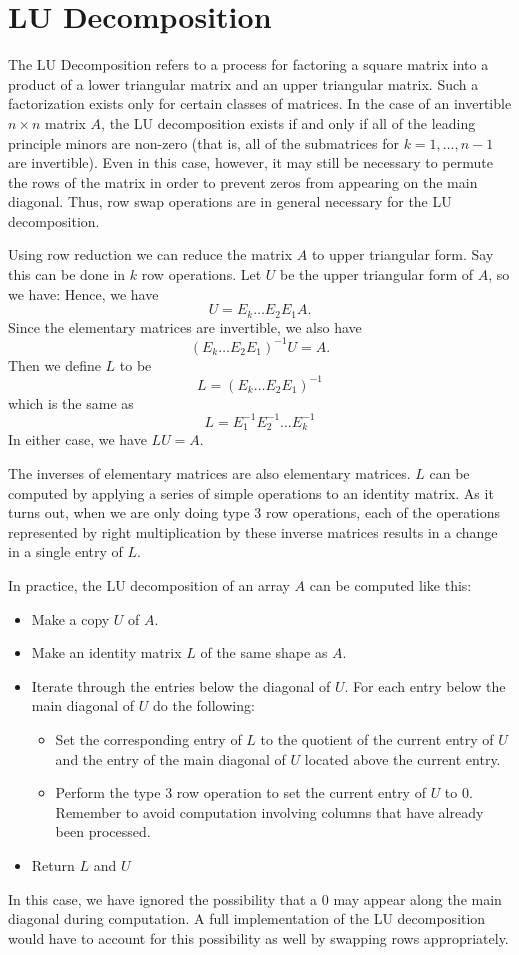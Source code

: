\section*{LU Decomposition}
The LU Decomposition refers to a process for factoring a square matrix into 
a product of a lower triangular matrix and an upper triangular matrix. Such 
a factorization exists only for certain classes of matrices. In the case 
of an invertible $n \times n$ matrix $A$, the LU decomposition exists if and only if all
of the leading principle minors are non-zero (that is, all of the
submatrices  for $k = 1,\ldots,n-1$ are invertible). Even in 
this case, however, it may still be necessary to permute the rows of the 
matrix in order to prevent zeros from appearing on the main diagonal. Thus, 
row swap operations are in general necessary for the LU decomposition. 

Using row reduction we can reduce the matrix $A$ to upper triangular form.
Say this can be done in $k$ row operations.
Let $U$ be the upper triangular form of $A$, so we have:
Hence, we have
\[
U = E_k \dots E_2 E_1 A.
\]
Since the elementary matrices are invertible, we also have
\[
(E_k \dots E_2 E_1)^{-1} U =  A.
\]
Then we define $L$ to be
\[
L = (E_k \dots E_2 E_1)^{-1}
\]
which is the same as
\[
L = E_1^{-1} E_2^{-1} \dots E_k^{-1}
\]
In either case, we have $L U = A$.

The inverses of elementary matrices are also elementary matrices. $L$ can be computed by applying a series of simple operations to an identity matrix.
As it turns out, when we are only doing type 3 row operations, each of the operations represented by right multiplication by these inverse matrices results in a change in a single entry of $L$.

In practice, the LU decomposition of an array $A$ can be computed like this:
\begin{itemize}
\item Make a copy $U$ of $A$.
\item Make an identity matrix $L$ of the same shape as $A$.
\item Iterate through the entries below the diagonal of $U$.
For each entry below the main diagonal of $U$ do the following:
	\begin{itemize}
	\item Set the corresponding entry of $L$ to the quotient of the current entry of $U$ and the entry of the main diagonal of $U$ located above the current entry.
	\item Perform the type 3 row operation to set the current entry of $U$ to 0.
		Remember to avoid computation involving columns that have already been processed.
	\end{itemize}
\item Return $L$ and $U$
\end{itemize}
In this case, we have ignored the possibility that a 0 may appear along the main diagonal during computation.
A full implementation of the LU decomposition would have to account for this possibility as well by swapping rows appropriately.

